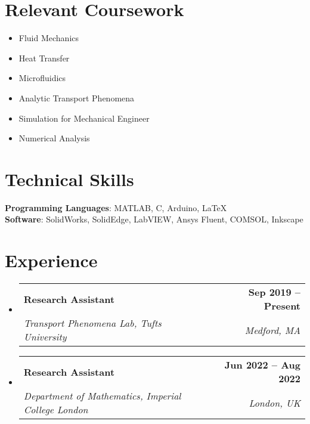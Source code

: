 \documentclass[letterpaper,11pt]{article}
\makeatletter
\newcommand{\resumeSubheading}[4]{
  \vspace{-2pt}\item
    \begin{tabular*}{1.0\textwidth}[t]{l@{\extracolsep{\fill}}r}
      \textbf{#1} & \textbf{\small #2} \\
      \textit{\small#3} & \textit{\small #4} \\
    \end{tabular*}\vspace{-7pt}
}
\newcommand{\resumeSubHeadingListStart}{\begin{itemize}[leftmargin=0.0in, label={}]}
\newcommand{\resumeSubHeadingListEnd}{\end{itemize}}
\makeatother
\begin{document}
\section{Relevant Coursework}
        \begin{multicols}{3}
            \begin{itemize}[itemsep=-5pt, parsep=3pt]
                \item\small Fluid Mechanics
                \item Heat Transfer
                \item Microfluidics
                \item Analytic Transport Phenomena
                
                \item Simulation for Mechanical Engineer
                
                \item Numerical Analysis
            \end{itemize}
        \end{multicols}
        \vspace*{2.0\multicolsep}
    
\section{Technical Skills}
 \begin{itemize}[leftmargin=0.15in, label={}]
    \small{\item{
     \textbf{Programming Languages}{: MATLAB, C, Arduino, LaTeX} \\
     \textbf{Software}{: SolidWorks, SolidEdge, LabVIEW, Ansys Fluent, COMSOL, Inkscape} \\
    }}
 \end{itemize}
 \vspace{-16pt}

\section{Experience}
  \resumeSubHeadingListStart
    \resumeSubheading
      {Research Assistant}{Sep 2019 -- Present}
      {Transport Phenomena Lab, Tufts University}{Medford, MA}
        \resumeSubheading
      {Research Assistant}{Jun 2022 -- Aug 2022}
      {Department of Mathematics, Imperial College London}{London, UK}
  \resumeSubHeadingListEnd
\end{document}
